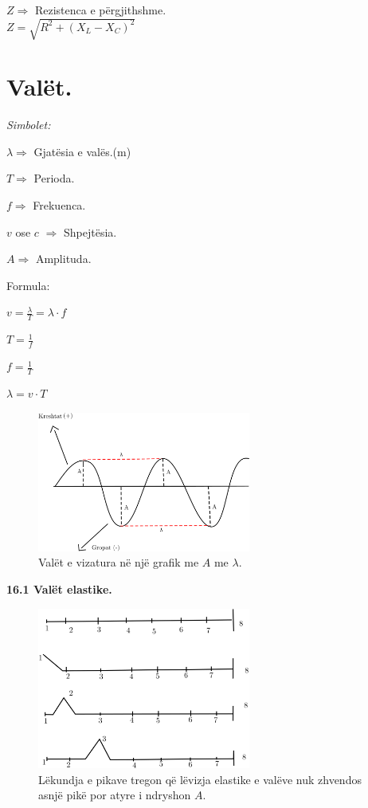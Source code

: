\documentclass[twocolumn]{article}
\begin{document}
	
	$Z \Rightarrow $ Rezistenca e përgjithshme.\\
	
	
	$Z= \sqrt{R^2+(X_L - X_C)^2}$
	
	\section{Valët.}
	
	\begin{center}
		\textit{Simbolet:}
	\end{center}
	
	$\lambda \Rightarrow $ Gjatësia e valës.(m)
	
	$T \Rightarrow $ Perioda.
	
	$f \Rightarrow$ Frekuenca.
	
	$v$ ose $c$ $\Rightarrow$ Shpejtësia.
	
	$A \Rightarrow$ Amplituda.
	

	
	\begin{center}
		Formula:
	\end{center}
	
	$v=\frac{\lambda}{T}= \lambda \cdot f$
	
	$T= \frac{1}{f}$
	
	$f=\frac{1}{T}$
	
	$\lambda = v \cdot T$
	\begin{figure}[h]
		\includegraphics[width=70mm]{Imazhet/valet.png}
		\caption{Valët e vizatura në një grafik me $A$ me $\lambda$.}
		\label{fig:boat1}
	\end{figure}
	
	\textbf{16.1 Valët elastike.}
	
	\begin{figure}[h]
		\includegraphics[width=70mm]{Imazhet/vale elastike.png}
		\caption{Lëkundja e pikave tregon që lëvizja elastike e valëve nuk zhvendos asnjë pikë por atyre i ndryshon $A$.}
		\label{fig:boat1}
	\end{figure}
	
\end{document}

